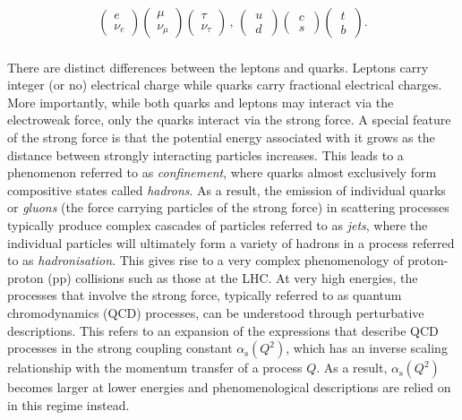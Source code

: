\begin{align}
        \begin{pmatrix}
            e \\
            \nu_{e}
        \end{pmatrix}
        \begin{pmatrix}
            \mu \\
            \nu_{\mu}
        \end{pmatrix}
        \begin{pmatrix}
            \tau \\
            \nu_{\tau}
        \end{pmatrix}
        \, , \,
        \begin{pmatrix}
            \, u \, \\
            \, d \,
        \end{pmatrix}
        \begin{pmatrix}
            \, c \, \\
            \, s \, 
        \end{pmatrix}
        \begin{pmatrix}
            \, t \, \\
            \, b \,
        \end{pmatrix}.
\end{align}
\\
There are distinct differences between the leptons and quarks. Leptons carry integer (or no) electrical charge while quarks carry fractional electrical charges. More importantly, while both quarks and leptons may interact via the electroweak force, only the quarks interact via the strong force. A special feature of the strong force is that the potential energy associated with it grows as the distance between strongly interacting particles increases. This leads to a phenomenon referred to as \textit{confinement}, where quarks almost exclusively form compositive states called \textit{hadrons}. As a result, the emission of individual quarks or \textit{gluons} (the force carrying particles of the strong force) in scattering processes typically produce complex cascades of particles referred to as \textit{jets}, where the individual particles will ultimately form a variety of hadrons in a process referred to as \textit{hadronisation}. This gives rise to a very complex phenomenology of proton-proton (pp) collisions such as those at the LHC. At very high energies, the processes that involve the strong force, typically referred to as quantum chromodynamics (QCD) processes, can be understood through perturbative descriptions. This refers to an expansion of the expressions that describe QCD processes in the strong coupling constant $\alpha_{\mathrm{s}}(Q^2)$, which has an inverse scaling relationship with the momentum transfer of a process $Q$. As a result, $\alpha_{\mathrm{s}}(Q^2)$ becomes larger at lower energies and phenomenological descriptions are relied on in this regime instead. \\

